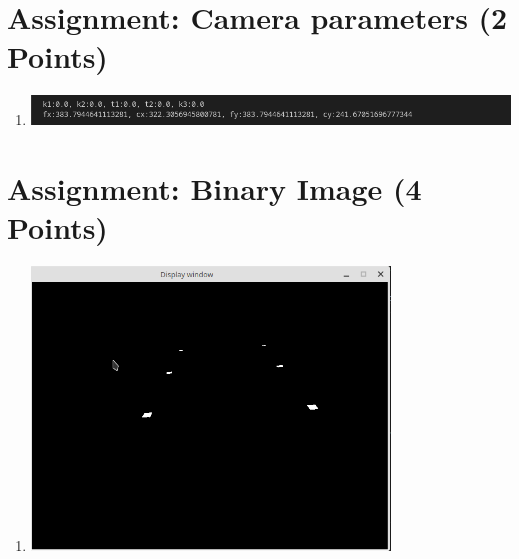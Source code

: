 

\newcommand{\dozent}{Prof. Goehring}
\newcommand{\tutor}{-}
\newcommand{\tutoriumNo}{01\\Materialien: Latex, Skript, Ros}
\newcommand{\ubungNo}{4}
\newcommand{\veranstaltung}{Robotik}
\newcommand{\semester}{WS21/22}
\newcommand{\studenten}{David Ly \& Ina Fendel \& Thore Brehmer}



\setcounter{section}{1}

\section{Assignment: Camera parameters (2 Points)}
\begin{enumerate}[]
    \item \includegraphics[width=1\textwidth]{src/u4/task2.png}
\end{enumerate}  

\section{Assignment: Binary Image (4 Points)}
\begin{enumerate}[]
    \item \includegraphics[width=0.75\textwidth]{src/u4/task3.png}
\end{enumerate}  

